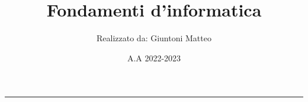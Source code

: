 \documentclass[a4paper,10pt]{article}
\title{\textbf{Fondamenti d'informatica}}
\author{Realizzato da: Giuntoni Matteo}
\date{A.A 2022-2023}
\theoremstyle{definition}
\theoremstyle{definition}
\theoremstyle{plain}
\theoremstyle{plain}
\theoremstyle{plain}
\theoremstyle{plain}
\begin{document}


\tableofcontents
\newpage
\maketitle
\begin{center}
    \vspace{-20pt}
    \rule{11cm}{.1pt} 
\end{center}







\end{document}
